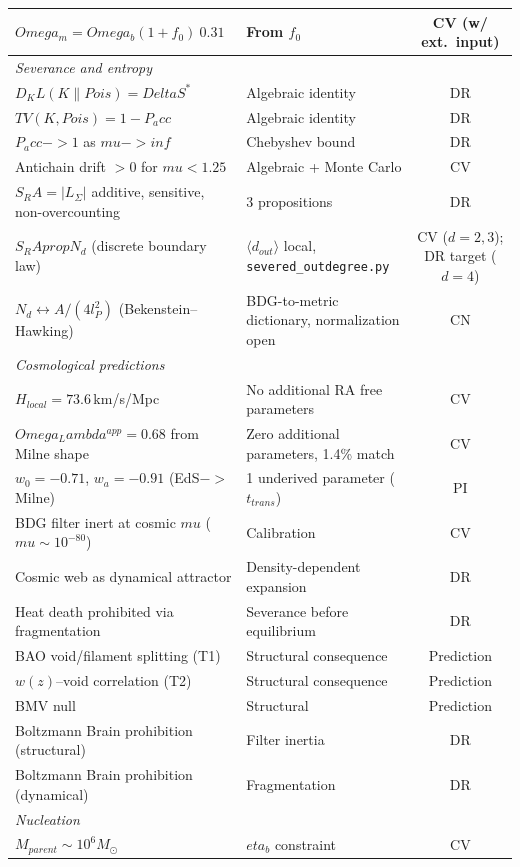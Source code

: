 \documentclass[11pt]{article}
\def\ell{l}%
\def\Delta{Delta}%
\def\Lambda{Lambda}%
\def\Omega{Omega}%
\def\mu{mu}%
\def\eta{eta}%
\def\mathrm#1{#1}%
\def\approx{~}%
\def\to{->}%
\def\infty{inf}%
\def\partial{d}%
\def\propto{prop}%
\def\SRa{S_RA}%
\def\Pacc{P_acc}%
\def\Dkl{D_KL}%
\def\TV{TV}%
\newcommand{\Pacc}{P_{\mathrm{acc}}}
\newcommand{\SRa}{S_{\mathrm{RA}}}
\newcommand{\Dkl}{D_{\mathrm{KL}}}
\newcommand{\TV}{\mathrm{TV}}
\begin{document}
\begin{center}
\begin{tabular}{llc}
$\Omega_m=\Omega_b(1+f_0)\approx 0.31$ & From $f_0$ & CV (w/ ext.\ input) \\
\midrule
\multicolumn{3}{l}{\textit{Severance and entropy}} \\
$\Dkl(K\|\mathrm{Pois})=\Delta S^*$ & Algebraic identity & DR \\
$\TV(K,\mathrm{Pois})=1-\Pacc$ & Algebraic identity & DR \\
$\Pacc\to 1$ as $\mu\to\infty$ & Chebyshev bound & DR \\
Antichain drift $>0$ for $\mu<1.25$ & Algebraic + Monte Carlo & CV \\
$\SRa=|L_\Sigma|$ additive, sensitive, non-overcounting & 3 propositions & DR \\
$\SRa\propto N_\partial$ (discrete boundary law) & $\langle d_{\mathrm{out}}\rangle$ local, \texttt{severed\_outdegree.py} & CV ($d=2,3$); DR target ($d=4$) \\
$N_\partial\leftrightarrow A/(4\ell_P^2)$ (Bekenstein--Hawking) & BDG-to-metric dictionary, normalization open & CN \\
\midrule
\multicolumn{3}{l}{\textit{Cosmological predictions}} \\
$H_{\mathrm{local}}=73.6$\,km/s/Mpc & No additional RA free parameters & CV \\
$\Omega_\Lambda^{\mathrm{app}}=0.68$ from Milne shape & Zero additional parameters, 1.4\% match & CV \\
$w_0=-0.71$, $w_a=-0.91$ (EdS$\to$Milne) & 1 underived parameter ($t_{\mathrm{trans}}$) & PI \\
BDG filter inert at cosmic $\mu$ ($\mu\sim 10^{-80}$) & Calibration & CV \\
Cosmic web as dynamical attractor & Density-dependent expansion & DR \\
Heat death prohibited via fragmentation & Severance before equilibrium & DR \\
BAO void/filament splitting (T1) & Structural consequence & Prediction \\
$w(z)$--void correlation (T2) & Structural consequence & Prediction \\
BMV null & Structural & Prediction \\
Boltzmann Brain prohibition (structural) & Filter inertia & DR \\
Boltzmann Brain prohibition (dynamical) & Fragmentation & DR \\
\midrule
\multicolumn{3}{l}{\textit{Nucleation}} \\
$M_{\mathrm{parent}}\sim 10^6 M_\odot$ & $\eta_b$ constraint & CV \\

\end{tabular}
\end{center}
\end{document}
